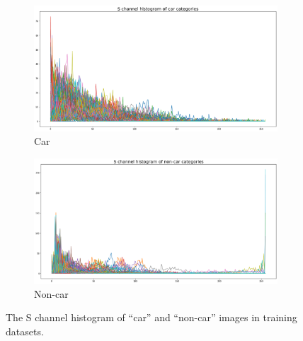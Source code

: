 \documentclass{article}[12pt, twocolumn]
\begin{document}
\begin{figure}[H]
    \centering
    \begin{subfigure}[b]{0.45\textwidth}
        \centering
        \includegraphics[width=\textwidth]{figure/S_car.png}
        \caption{Car}
    \end{subfigure}
    \hfill
    \begin{subfigure}[b]{0.45\textwidth}
        \centering
        \includegraphics[width=\textwidth]{figure/S_noncar.png}
        \caption{Non-car}
    \end{subfigure}
    \caption{The S channel histogram of ``car'' and ``non-car'' images in training datasets.}
    \label{fig:hsv_s}
\end{figure}
\end{document}
